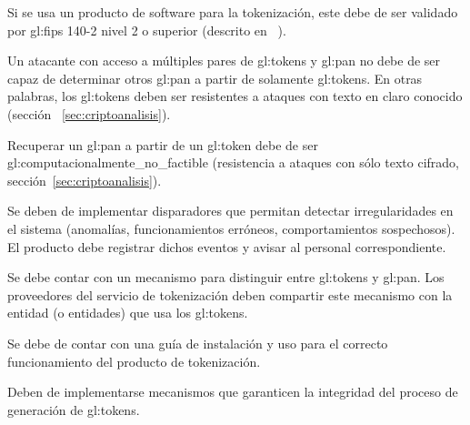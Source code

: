 {
  Si se usa un producto de software para la tokenización, este debe de ser
  validado por \gls{gl:fips} 140-2 nivel 2 o superior (descrito en
 ~\cite{nist_modulos_criptograficos}).
}

{
  Un atacante con acceso a múltiples pares de \glspl{gl:token} y
  \gls{gl:pan} no debe de ser capaz de determinar otros \gls{gl:pan} a partir
  de solamente \glspl{gl:token}. En otras palabras, los \glspl{gl:token}
  deben ser resistentes a ataques con texto en claro conocido (sección
 ~\ref{sec:criptoanalisis}).
}

{
  Recuperar un \gls{gl:pan} a partir de un \gls{gl:token} debe de ser
  \gls{gl:computacionalmente_no_factible} (resistencia a ataques con sólo
  texto cifrado, sección~\ref{sec:criptoanalisis}).
}

{
  Se deben de implementar disparadores que permitan detectar
  irregularidades en el sistema (anomalías, funcionamientos erróneos,
  comportamientos sospechosos). El producto debe registrar dichos eventos y
  avisar al personal correspondiente.
}

{
  Se debe contar con un mecanismo para distinguir entre \glspl{gl:token}
  y \gls{gl:pan}. Los proveedores del servicio de tokenización deben
  compartir este mecanismo con la entidad (o entidades) que usa los
  \glspl{gl:token}.
}

{
  Se debe de contar con una guía de instalación y uso para el correcto
  funcionamiento del producto de tokenización.
}

{
  Deben de implementarse mecanismos que garanticen la integridad del proceso
  de generación de \glspl{gl:token}.
}

